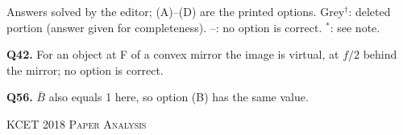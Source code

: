 {\footnotesize Answers solved by the editor; (A)--(D) are the printed options. {\color{gray}Grey$^{\dagger}$}: deleted portion (answer given for completeness). --: no option is correct. $^{*}$: see note.\par
\par\smallskip\textbf{Q42.} For an object at F of a convex mirror the image is virtual, at $f/2$ behind the mirror; no option is correct.
\par\smallskip\textbf{Q56.} $\bar B$ also equals 1 here, so option (B) has the same value.
}\par
\clearpage
\begin{center}{}\par
{\fontsize{20}{24}\selectfont\color{navy}\scshape KCET 2018 \textperiodcentered{} Paper Analysis}\par
{\color{gilt}}\end{center}
\vspace{4pt}
